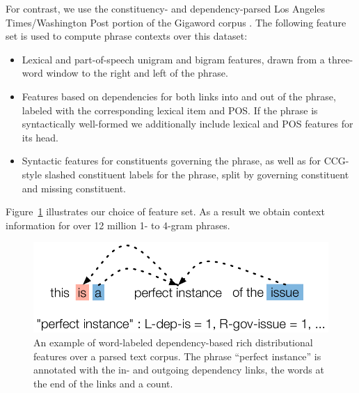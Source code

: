 \documentclass[11pt]{article}
\begin{document}
For contrast, we use the constituency- and dependency-parsed Los
Angeles Times/Washington Post portion of the Gigaword corpus
\cite{Gigaword}. The following feature set is used to compute phrase
contexts over this dataset:
\begin{itemize}
\item Lexical and part-of-speech unigram and bigram features,
  drawn from a three-word window to the right and left of the phrase. 
\item Features based on dependencies for both links into and out of
  the phrase, labeled with the corresponding lexical item and POS. If
  the phrase is syntactically well-formed we additionally include
  lexical and POS features for its head.
\item Syntactic features for constituents governing the phrase, as
  well as for CCG-style slashed constituent labels for the phrase,
  split by governing constituent and missing constituent. 
\end{itemize}
Figure~\ref{fig-rich-context} illustrates our choice of feature
set. As a result we obtain context information for over 12 million 1-
to 4-gram phrases.

\begin{figure}[!t]
\begin{center}
\includegraphics[width=0.99\linewidth]{figures/rich_context.pdf}
\end{center}
\caption{An example of word-labeled dependency-based rich
  distributional features over a parsed text corpus. The phrase
  ``perfect instance'' is annotated with the in- and outgoing
  dependency links, the words at the end of the links and a
  count.}\label{fig-rich-context}
\end{figure}
\end{document}
